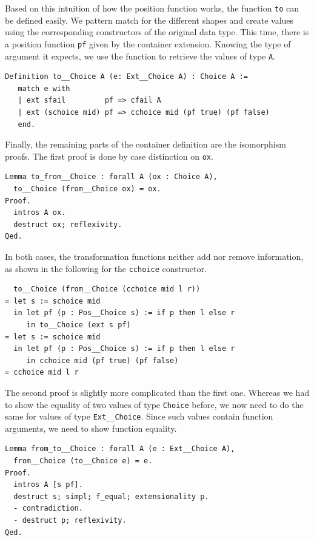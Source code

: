 \documentclass[a4paper, 11pt, fleqn, twoside, abstract=on]{scrreprt}
\newcommand{\cinl}[1]{\texttt{#1}}
\begin{document}
Based on this intuition of how the position function works, the function \cinl{to} can be defined easily.
We pattern match for the different shapes and create values using the corresponding constructors of the original data type.
This time, there is a position function \cinl{pf} given by the container extension.
Knowing the type of argument it expects, we use the function to retrieve the values of type \cinl{A}.

\begin{verbatim}
Definition to__Choice A (e: Ext__Choice A) : Choice A :=
   match e with
   | ext sfail         pf => cfail A
   | ext (schoice mid) pf => cchoice mid (pf true) (pf false)
   end.
\end{verbatim}

Finally, the remaining parts of the container definition are the isomorphism proofs.
The first proof is done by case distinction on \cinl{ox}.

\begin{verbatim}
Lemma to_from__Choice : forall A (ox : Choice A),
  to__Choice (from__Choice ox) = ox.
Proof.
  intros A ox.
  destruct ox; reflexivity.
Qed.
\end{verbatim}

In both cases, the transformation functions neither add nor remove information, as shown in the following for the \cinl{cchoice} constructor.

\begin{verbatim}
  to__Choice (from__Choice (cchoice mid l r))
= let s := schoice mid
  in let pf (p : Pos__Choice s) := if p then l else r
     in to__Choice (ext s pf)
= let s := schoice mid
  in let pf (p : Pos__Choice s) := if p then l else r
     in cchoice mid (pf true) (pf false)
= cchoice mid l r
\end{verbatim}

The second proof is slightly more complicated than the first one.
Whereas we had to show the equality of two values of type \cinl{Choice} before, we now need to do the same for values of type \cinl{Ext__Choice}.
Since such values contain function arguments, we need to show function equality.

\begin{verbatim}
Lemma from_to__Choice : forall A (e : Ext__Choice A),
  from__Choice (to__Choice e) = e.
Proof.
  intros A [s pf].
  destruct s; simpl; f_equal; extensionality p.
  - contradiction.
  - destruct p; reflexivity.
Qed. 
\end{verbatim}
\end{document}
